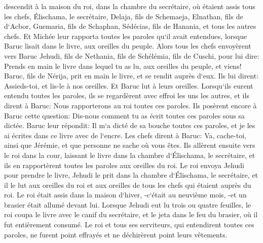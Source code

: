 \verse descendit à la maison du roi, dans la chambre du secrétaire, où étaient assis tous les chefs, Élischama, le secrétaire, Delaja, fils de Schemaeja, Elnathan, fils de d`Acbor, Guemaria, fils de Schaphan, Sédécias, fils de Hanania, et tous les autres chefs. 
\verse Et Michée leur rapporta toutes les paroles qu`il avait entendues, lorsque Baruc lisait dans le livre, aux oreilles du peuple. 
\verse Alors tous les chefs envoyèrent vers Baruc Jehudi, fils de Nethania, fils de Schélémia, fils de Cuschi, pour lui dire: Prends en main le livre dans lequel tu as lu, aux oreilles du peuple, et viens! Baruc, fils de Nérija, prit en main le livre, et se rendit auprès d`eux. 
\verse Ils lui dirent: Assieds-toi, et lis-le à nos oreilles. Et Baruc lut à leurs oreilles. 
\verse Lorsqu`ils eurent entendu toutes les paroles, ils se regardèrent avec effroi les uns les autres, et ils dirent à Baruc: Nous rapporterons au roi toutes ces paroles. 
\verse Ils posèrent encore à Baruc cette question: Dis-nous comment tu as écrit toutes ces paroles sous sa dictée. 
\verse Baruc leur répondit: Il m`a dicté de sa bouche toutes ces paroles, et je les ai écrites dans ce livre avec de l`encre. 
\verse Les chefs dirent à Baruc: Va, cache-toi, ainsi que Jérémie, et que personne ne sache où vous êtes. 
\verse Ils allèrent ensuite vers le roi dans la cour, laissant le livre dans la chambre d`Élischama, le secrétaire, et ils en rapportèrent toutes les paroles aux oreilles du roi. 
\verse Le roi envoya Jehudi pour prendre le livre, Jehudi le prit dans la chambre d`Élischama, le secrétaire, et il le lut aux oreilles du roi et aux oreilles de tous les chefs qui étaient auprès du roi. 
\verse Le roi était assis dans la maison d`hiver, -c`était au neuvième mois, -et un brasier était allumé devant lui. 
\verse Lorsque Jehudi eut lu trois ou quatre feuilles, le roi coupa le livre avec le canif du secrétaire, et le jeta dans le feu du brasier, où il fut entièrement consumé. 
\verse Le roi et tous ses serviteurs, qui entendirent toutes ces paroles, ne furent point effrayés et ne déchirèrent point leurs vêtements. 
